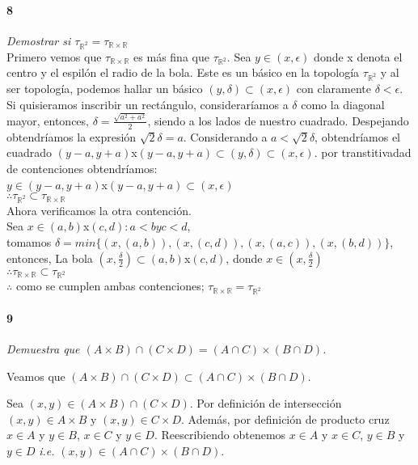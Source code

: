 \documentclass[12pt]{article}
\begin{document}
\paragraph{8}
\textit{Demostrar si $\tau_{\mathbb{R}^2}=\tau_{\mathbb{R} \times \mathbb{R}}$}
\\Primero vemos que \(\tau_{\mathbb{R} \times \mathbb{R}}\)  es más fina que \( \tau_{\mathbb{R}^2}\).
Sea \(y\in(x,\epsilon)\) donde x denota el centro y el espilón el radio de la bola. Este es un básico en la topología \( \tau_{\mathbb{R}^2}\) y al ser topología, podemos hallar un básico \((y,\delta)\subset(x,\epsilon)\) con claramente \(\delta<\epsilon\).
\\Si quisieramos inscribir un rectángulo, consideraríamos a \(\delta\) como la diagonal mayor, entonces, \(\delta=\frac{\sqrt{a^2+a^2}}{2}\), siendo a los lados de nuestro cuadrado. Despejando obtendríamos la expresión \(\sqrt{2}\delta=a\). Considerando a \(a<\sqrt{2}\delta\), obtendríamos el cuadrado \((y-a,y+a)\)x\((y-a,y+a)\subset(y,\delta)\subset(x,\epsilon)\). por transtitivadad de contenciones obtendríamos:
\\\(y\in(y-a,y+a)\)x\((y-a,y+a)\subset(x,\epsilon)\)
\\\(\therefore\tau_{\mathbb{R}^2}\subset\tau_{\mathbb{R} \times \mathbb{R}}\)
\\Ahora verificamos la otra contención.
\\Sea \(x\in(a,b)\)x\((c,d): a<b y c<d\),
\\tomamos \(\delta=min\{(x,(a,b)),(x,(c,d)),(x,(a,c)),(x,(b,d))\}\), entonces, La bola \((x,\frac{\delta}{2})\subset(a,b)\)x\((c,d)\), donde \(x\in(x,\frac{\delta}{2})\)
\\\(\therefore\tau_{\mathbb{R} \times \mathbb{R}}\subset\tau_{\mathbb{R}^2}\)
\\\(\therefore\) como se cumplen ambas contenciones; \(\tau_{\mathbb{R} \times \mathbb{R}}=\tau_{\mathbb{R}^2}\)


\paragraph{9}
\textit{Demuestra que $(A \times B) \cap (C \times D)= (A \cap C) \times (B \cap D)$.}

Veamos que $(A \times B) \cap (C \times D)  \subset (A \cap C) \times (B \cap D)$.

Sea $(x,y) \in (A \times B) \cap (C \times D)$. Por definición de intersección $(x,y)\in A\times B$ y $(x,y) \in C\times D$. Además, por definición
de producto cruz $x \in A $ y $y \in B$, $x \in C$ y $y \in D$. Reescribiendo obtenemos $x\in A$ y $x\in C$, $y \in B$ y $y\in D$ \textit{i.e.}  $(x,y) \in (A \cap C)\times (B \cap D)$.
\end{document}

